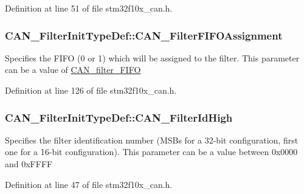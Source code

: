 Definition at line 51 of file stm32f10x\+\_\+can.\+h.

\subsubsection[{\texorpdfstring{C\+A\+N\+\_\+\+Filter\+F\+I\+F\+O\+Assignment}{CAN_FilterFIFOAssignment}}]{ C\+A\+N\+\_\+\+Filter\+Init\+Type\+Def\+::\+C\+A\+N\+\_\+\+Filter\+F\+I\+F\+O\+Assignment}\hypertarget{struct_c_a_n___filter_init_type_def_a01ba491f12097adcc9f0a3d627628d55}{}\label{struct_c_a_n___filter_init_type_def_a01ba491f12097adcc9f0a3d627628d55}
Specifies the F\+I\+FO (0 or 1) which will be assigned to the filter. This parameter can be a value of \hyperlink{group___c_a_n__filter___f_i_f_o}{C\+A\+N\+\_\+filter\+\_\+\+F\+I\+FO} 

Definition at line 126 of file stm32f10x\+\_\+can.\+h.

\subsubsection[{\texorpdfstring{C\+A\+N\+\_\+\+Filter\+Id\+High}{CAN_FilterIdHigh}}]{ C\+A\+N\+\_\+\+Filter\+Init\+Type\+Def\+::\+C\+A\+N\+\_\+\+Filter\+Id\+High}\hypertarget{struct_c_a_n___filter_init_type_def_a04335637e20073aa50961a5352d6b38c}{}\label{struct_c_a_n___filter_init_type_def_a04335637e20073aa50961a5352d6b38c}
Specifies the filter identification number (M\+S\+Bs for a 32-\/bit configuration, first one for a 16-\/bit configuration). This parameter can be a value between 0x0000 and 0x\+F\+F\+FF 

Definition at line 47 of file stm32f10x\+\_\+can.\+h.

